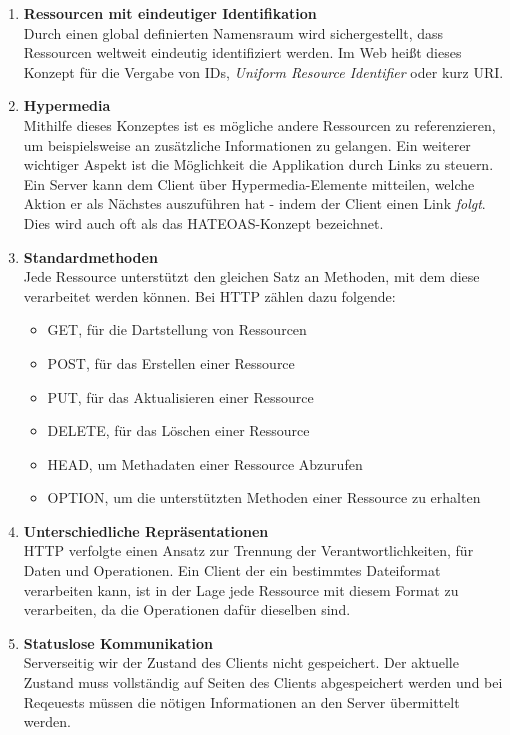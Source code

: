 \begin{enumerate}
	\item \textbf{Ressourcen mit eindeutiger Identifikation}\\
	Durch einen global definierten Namensraum wird sichergestellt, dass Ressourcen weltweit eindeutig identifiziert werden. Im Web heißt dieses Konzept für die Vergabe von IDs, \textit{Uniform Resource Identifier} oder kurz URI. 
	
	\item \textbf{Hypermedia}\\
	Mithilfe dieses Konzeptes ist es mögliche andere Ressourcen zu referenzieren, um beispielsweise an zusätzliche Informationen zu gelangen. Ein weiterer wichtiger Aspekt ist die Möglichkeit die Applikation durch Links zu steuern. Ein Server kann dem Client über Hypermedia-Elemente mitteilen, welche Aktion er als Nächstes auszuführen hat - indem der Client einen Link \textit{folgt}. Dies wird auch oft als das HATEOAS-Konzept bezeichnet. 
	
	\item \textbf{Standardmethoden}\\
	Jede Ressource unterstützt den gleichen Satz an Methoden, mit dem diese verarbeitet werden können. Bei HTTP zählen dazu folgende:
	\begin{itemize}
		\item GET, für die Dartstellung von Ressourcen
		\item POST, für das Erstellen einer Ressource
		\item PUT, für das Aktualisieren einer Ressource
		\item DELETE, für das Löschen einer Ressource
		\item HEAD, um Methadaten einer Ressource Abzurufen
		\item OPTION, um die unterstützten Methoden einer Ressource zu erhalten
	\end{itemize}
	
	\item \textbf{Unterschiedliche Repräsentationen}\\
	HTTP verfolgte einen Ansatz zur Trennung der Verantwortlichkeiten, für Daten und Operationen. Ein Client der ein bestimmtes Dateiformat verarbeiten kann, ist in der Lage jede Ressource mit diesem Format zu verarbeiten, da die Operationen dafür dieselben sind. 
	
	\item \textbf{Statuslose Kommunikation}\\
	Serverseitig wir der Zustand des Clients nicht gespeichert. Der aktuelle Zustand muss vollständig auf Seiten des Clients abgespeichert werden und bei Reqeuests müssen die nötigen Informationen an den Server übermittelt werden.
	
\end{enumerate}

